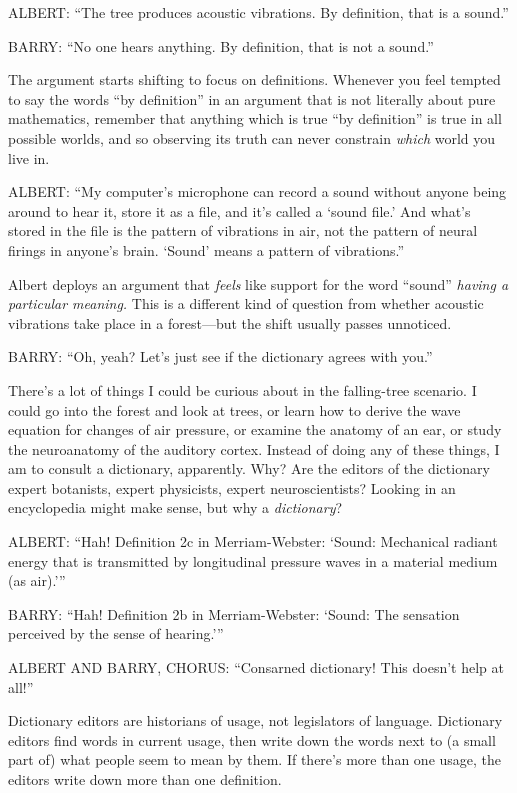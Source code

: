 {
 ALBERT: ``The tree produces acoustic vibrations.
By definition, that is a sound.''}

{
 BARRY: ``No one hears anything. By definition,
that is not a sound.''}

{
 The argument starts shifting to focus on definitions. Whenever you
feel tempted to say the words ``by
definition'' in an argument that is not literally
about pure mathematics, remember that anything which is true
``by definition'' is true in all
possible worlds, and so observing its truth can never constrain
\textit{which} world you live in.}

{
 ALBERT: ``My computer's
microphone can record a sound without anyone being around to hear it,
store it as a file, and it's called a
`sound file.' And what's
stored in the file is the pattern of vibrations in air, not the pattern
of neural firings in anyone's brain.
`Sound' means a pattern of
vibrations.''}

{
 Albert deploys an argument that \textit{feels} like support for
the word ``sound'' \textit{having a
particular meaning.} This is a different kind of question from whether
acoustic vibrations take place in a forest---but the shift usually
passes unnoticed.}

{
 BARRY: ``Oh, yeah? Let's just see
if the dictionary agrees with you.''}

{
 There's a lot of things I could be curious about
in the falling-tree scenario. I could go into the forest and look at
trees, or learn how to derive the wave equation for changes of air
pressure, or examine the anatomy of an ear, or study the neuroanatomy
of the auditory cortex. Instead of doing any of these things, I am to
consult a dictionary, apparently. Why? Are the editors of the
dictionary expert botanists, expert physicists, expert neuroscientists?
Looking in an encyclopedia might make sense, but why a
\textit{dictionary}?}

{
 ALBERT: ``Hah! Definition 2c in Merriam-Webster:
`Sound: Mechanical radiant energy that is transmitted by
longitudinal pressure waves in a material medium (as
air).'''}

{
 BARRY: ``Hah! Definition 2b in Merriam-Webster:
`Sound: The sensation perceived by the sense of
hearing.'''}

{
 ALBERT AND BARRY, CHORUS: ``Consarned dictionary!
This doesn't help at all!''}

{
 Dictionary editors are historians of usage, not legislators of
language. Dictionary editors find words in current usage, then write
down the words next to (a small part of) what people seem to mean by
them. If there's more than one usage, the editors write
down more than one definition.}

